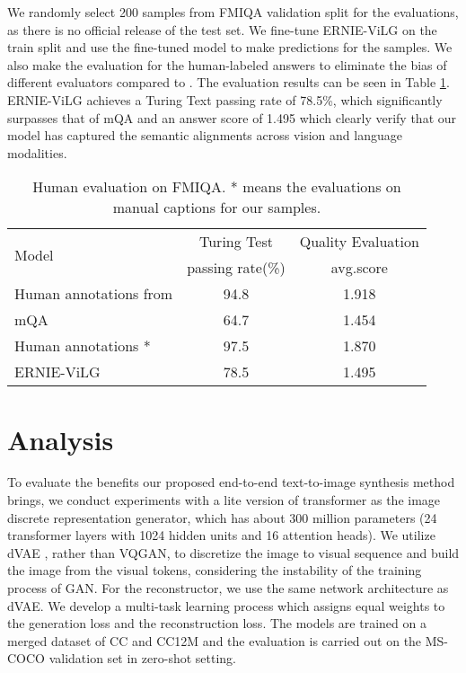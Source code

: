 \documentclass{article}
\begin{document}
We randomly select 200 samples from FMIQA validation split for the evaluations, as there is no official release of the test set. We fine-tune ERNIE-ViLG on the train split and use the fine-tuned model to make predictions for the samples. We also make the evaluation for the human-labeled answers to eliminate the bias of different evaluators compared to \cite{gao2015fmiqa}. The evaluation results can be seen in Table \ref{exp-ft-i2t-human-fmiqa-result}. ERNIE-ViLG achieves a Turing Text passing rate of 78.5\%, which significantly surpasses that of mQA \cite{gao2015fmiqa} and an answer score of 1.495 which clearly verify that our model has captured the semantic alignments across vision and language modalities. 

\begin{table}[htb]
  \caption{Human evaluation on FMIQA. * means the evaluations on manual captions for our samples.}
  \begin{tabular}{l|c|c}
    \toprule
    \multirow{2}{*}{Model}    & Turing Test & Quality Evaluation\\
                       & passing rate(\%) & avg.score\\
    \midrule
    Human annotations from \cite{gao2015fmiqa}    & 94.8          & 1.918 \\
    mQA \cite{gao2015fmiqa}      & 64.7          & 1.454 \\
    \midrule
    Human annotations *              & 97.5           & 1.870 \\
    ERNIE-ViLG              & 78.5           & 1.495 \\
    \bottomrule
  \end{tabular}
  \label{exp-ft-i2t-human-fmiqa-result}
  \centering
\end{table}

\section{Analysis} \label{section:end2endexp}
To evaluate the benefits our proposed end-to-end text-to-image synthesis method brings, we conduct experiments with a lite version of transformer as the image discrete representation generator, which has about 300 million parameters (24 transformer layers with 1024 hidden units and 16 attention heads).
We utilize dVAE \cite{ramesh2021zero}, rather than VQGAN, to discretize the image to visual sequence and build the image from the visual tokens, considering the instability of the training process of GAN. For the reconstructor, we use the same network architecture as dVAE. We develop a multi-task learning process which assigns equal weights to the generation loss and the reconstruction loss. The models are trained on a merged dataset of CC and CC12M and the evaluation is carried out on the MS-COCO validation set in  zero-shot setting. 
\end{document}
